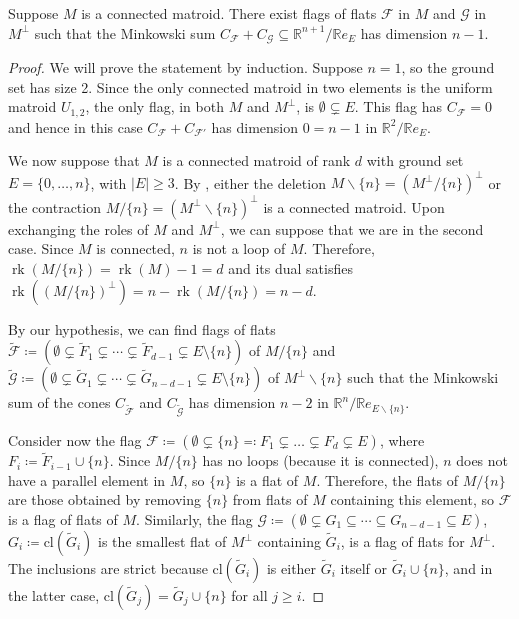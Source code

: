 \documentclass[12pt,a4paper,english]{scrartcl}
\newcommand{\RR}{\mathbb{R}}
\DeclareMathOperator{\rank}{rk}
\begin{document}
\begin{lemma}\label{lem: connected}
Suppose $M$ is a connected matroid. There exist flags of flats $\mathcal{F}$ in $M$ and $\mathcal{G}$ in $M^\perp$ such that the Minkowski sum $C_{\mathcal{F}}+C_{\mathcal{G}} \subseteq \mathbb{R}^{n+1}/ \RR e_E$ has dimension $n-1$.
\end{lemma}

\begin{proof}
We will prove the statement by induction.
Suppose $n=1$, so the ground set has size 2. Since the only connected matroid in two elements is the uniform matroid $U_{1,2}$, the only flag, in both $M$ and $M^\perp$, is $\emptyset \subsetneq E$. This flag has $C_{\mathcal{F}} = 0$ and hence in this case $C_{\mathcal{F}} + C_{\mathcal{F}'}$ has dimension $0 = n-1$ in $\RR^2/\RR e_E$.

We now suppose that $M$ is a connected matroid of rank $d$ with ground set $E = \{0, \dots, n\}$, with $|E| \geq 3$. By \cite[Proposition 7.69(1)]{WhiteMatroids1986}, either the deletion $M\backslash\{n\} = (M^\perp/\{n\})^\perp$ or the contraction $M/\{n\} = (M^\perp\backslash\{n\})^\perp$ is a connected matroid. Upon exchanging the roles of $M$ and $M^\perp$, we can suppose that we are in the second case.
Since $M$ is connected, $n$ is not a loop of $M$. Therefore, $\rank(M/\{n\}) = \rank(M) - 1 = d$ and its dual satisfies $\rank((M/\{n\})^\perp) = n -\rank(M/\{n\}) = n-d$.

By our hypothesis, we can find flags of flats $\widetilde{\mathcal F} \coloneq (\emptyset \subsetneq \widetilde{F}_1 \subsetneq \cdots \subsetneq \widetilde{F}_{d-1} \subsetneq E\setminus\{n\})$ of $M/\{n\}$ and $\widetilde{\mathcal G} \coloneq (\emptyset \subsetneq \widetilde{G}_1 \subsetneq \cdots \subsetneq \widetilde{G}_{n-d-1} \subsetneq E\setminus\{n\})$ of $M^\perp\backslash\{n\}$
such that the Minkowski sum of the cones $C_{\widetilde{\mathcal F}}$ and $C_{\widetilde{\mathcal{G}}}$ has dimension $n-2$ in $\mathbb{R}^{n}/\RR e_{E\backslash\{n\}}$.

Consider now the flag $\mathcal{F} \coloneq (\emptyset \subsetneq \{n\} \eqcolon F_1 \subsetneq \dots \subsetneq F_{d} \subsetneq E)$, where $F_i \coloneq \widetilde{F}_{i-1} \cup \{n\}$. 
Since $M/\{n\}$ has no loops (because it is connected), $n$ does not have a parallel element in $M$, so $\{n\}$ is a flat of $M$. Therefore, the flats of $M/\{n\}$ are those obtained by removing $\{n\}$ from flats of $M$ containing this element, so $\mathcal{F}$ is a flag of flats of $M$. 
Similarly, the flag $\mathcal{G} \coloneq (\emptyset \subsetneq G_1 \subseteq \cdots \subseteq G_{n-d-1}\subseteq E)$, $G_i\coloneq \text{cl}(\widetilde{G}_i)$ is the smallest flat of $M^\perp$ containing $\widetilde{G}_i$, is a flag of flats for $M^\perp$. The inclusions are strict because $\text{cl}(\widetilde{G}_i)$ is either $\widetilde{G}_i$ itself or $\widetilde{G}_i \cup \{n\}$, and in the latter case, $\text{cl}(\widetilde{G}_j) = \widetilde{G}_j \cup \{n\}$ for all $j \geq i$.


\end{proof}
\end{document}
